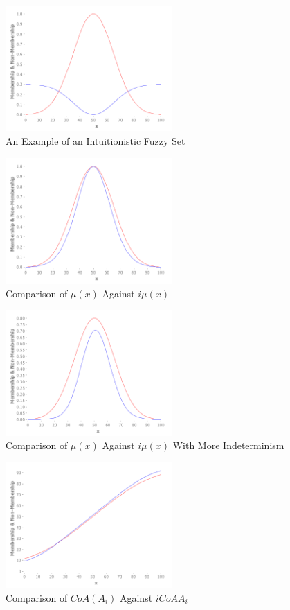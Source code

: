\documentclass[conference]{IEEEtran}
\begin{document}
\begin{figure}[!t]
  \centering
  \includegraphics[width=2.5in]{ifs}
  \caption{An Example of an Intuitionistic Fuzzy Set}
  \label{ifs}
\end{figure}

\begin{figure}[!t]
  \centering
  \includegraphics[width=2.5in]{if-membership}
  \caption{Comparison of $\mu(x)$ Against $i\mu(x)$}
  \label{if-membership}
\end{figure}

\begin{figure}[!t]
  \centering
  \includegraphics[width=2.5in]{if-membership-drastic}
  \caption{Comparison of $\mu(x)$ Against $i\mu(x)$ With More Indeterminism}
  \label{if-membership-drastic}
\end{figure}

\begin{figure}[!t]
  \centering
  \includegraphics[width=2.5in]{if-coa-vs-coa}
  \caption{Comparison of $CoA(A_{i})$ Against $iCoA{A_{i}}$}
  \label{if-coa-vs-coa}
\end{figure}
\end{document}
